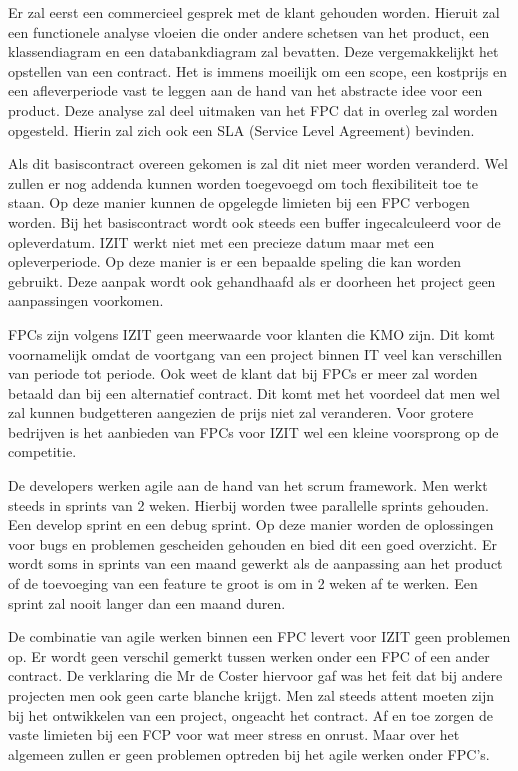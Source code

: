 \documentclass{hogent-article}
\begin{document}
    Er zal eerst een commercieel gesprek met de klant gehouden worden. Hieruit zal een functionele analyse vloeien die onder andere schetsen van het product, een klassendiagram en een databankdiagram zal bevatten. Deze vergemakkelijkt het opstellen van een contract. Het is immens moeilijk om een scope, een kostprijs en een afleverperiode vast te leggen aan de hand van het abstracte idee voor een product. Deze analyse zal deel uitmaken van het FPC dat in overleg zal worden opgesteld. Hierin zal zich ook een SLA (Service Level Agreement) bevinden.
    
    Als dit basiscontract overeen gekomen is zal dit niet meer worden veranderd. Wel zullen er nog addenda kunnen worden toegevoegd om toch flexibiliteit toe te staan. Op deze manier kunnen de opgelegde limieten bij een FPC verbogen worden. Bij het basiscontract wordt ook steeds een buffer ingecalculeerd voor de opleverdatum. IZIT werkt niet met een precieze datum maar met een opleverperiode. Op deze manier is er een bepaalde speling die kan worden gebruikt. Deze aanpak wordt ook gehandhaafd als er doorheen het project geen aanpassingen voorkomen.
    
    FPCs zijn volgens IZIT geen meerwaarde voor klanten die KMO zijn. Dit komt voornamelijk omdat de voortgang van een project binnen IT veel kan verschillen van periode tot periode. Ook weet de klant dat bij FPCs er meer zal worden betaald dan bij een alternatief contract. Dit komt met het voordeel dat men wel zal kunnen budgetteren aangezien de prijs niet zal veranderen. Voor grotere bedrijven is het aanbieden van FPCs voor IZIT wel een kleine voorsprong op de competitie.
    
    De developers werken agile aan de hand van het scrum framework. Men werkt steeds in sprints van 2 weken. Hierbij worden twee parallelle sprints gehouden. Een develop sprint en een debug sprint. Op deze manier worden de oplossingen voor bugs en problemen gescheiden gehouden en bied dit een goed overzicht. Er wordt soms in sprints van een maand gewerkt als de aanpassing aan het product of de toevoeging van een feature te groot is om in 2 weken af te werken. Een sprint zal nooit langer dan een maand duren. 
    
     De combinatie van agile werken binnen een FPC levert voor IZIT geen problemen op. Er wordt geen verschil gemerkt tussen werken onder een FPC of een ander contract. De verklaring die Mr de Coster hiervoor gaf was het feit dat bij andere projecten men ook geen carte blanche krijgt. Men zal steeds attent moeten zijn bij het ontwikkelen van een project, ongeacht het contract. Af en toe zorgen de vaste limieten bij een FCP  voor wat meer stress en onrust. Maar over het algemeen zullen er geen problemen optreden bij het agile werken onder FPC's.
    
\end{document}
